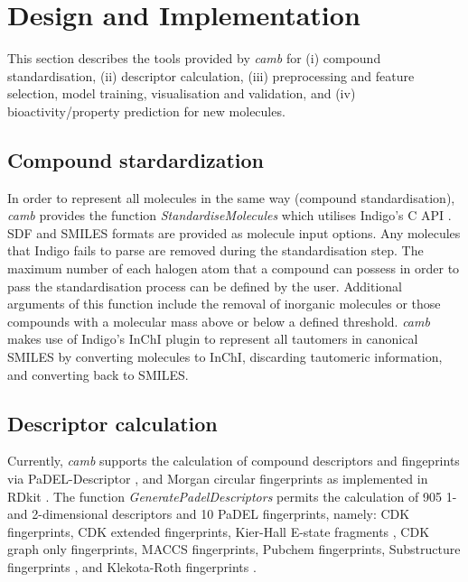 \documentclass[twoside,a4wide,10pt]{article}
\begin{document}
\section*{Design and Implementation}

This section describes the tools provided by {\it camb} 
for (i) compound standardisation, (ii) 
descriptor calculation, 
(iii) preprocessing and feature selection, model training, visualisation and validation, and (iv) bioactivity/property prediction for new molecules.

\subsection{Compound stardardization}
In order to represent all molecules in the same 
way (compound standardisation),
{\it camb}  provides the function {\it StandardiseMolecules} which utilises Indigo's C API \citep{Indigo}.
SDF and SMILES formats are provided as molecule input options. Any molecules that Indigo fails to parse are removed during the standardisation step.
The maximum number of each halogen atom that a compound can possess in order to pass the standardisation process can be defined by the user.
Additional arguments of this function include the removal of inorganic molecules
or those compounds with a molecular mass above or below a defined threshold.
{\it camb} makes use of Indigo's InChI \citep{inchi} plugin to represent all tautomers in canonical SMILES
by converting molecules to InChI, discarding tautomeric information, and converting back to SMILES.  

\subsection{Descriptor calculation} 

Currently, {\it camb} supports the calculation of compound descriptors and fingeprints via PaDEL-Descriptor \citep{padel},
and Morgan circular fingerprints \citep{extended_fp} as implemented in RDkit \citep{rdkit}.
The function {\it GeneratePadelDescriptors} permits the calculation of 905 1- and 2-dimensional descriptors and 10 PaDEL fingerprints, namely: 
CDK fingerprints, CDK extended fingerprints, Kier-Hall E-state fragments \cite{state_fp}, CDK graph only fingerprints, MACCS fingerprints,
Pubchem fingerprints, Substructure fingerprints \citep{obabel}, and Klekota-Roth fingerprints \citep{privileged_substructures}.
\end{document}
